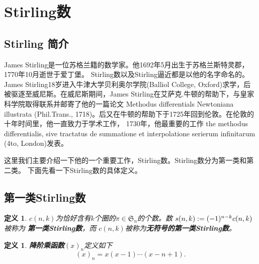 \documentclass[a4paper,11pt]{article}
\newtheorem{defi}[thm]{定义}
\begin{document}
%





\section{Stirling数}

\subsection{Stirling 简介} James
Stirling是一位苏格兰籍的数学家。他1692年5月出生于苏格兰斯特灵郡，1770年10月逝世于爱丁堡。
Stirling数以及Stirling逼近都是以他的名字命名的。James
Stirling18岁进入牛津大学贝利奥尔学院(Balliol College,
Oxford)求学，后被驱逐至威尼斯。在威尼斯期间，James
Stirling在艾萨克.牛顿的帮助下，与皇家科学院取得联系并邮寄了他的一篇论文
Methodus differentials Newtoniana illustrata (Phil.Trans.,
1718)。后又在牛顿的帮助下于1725年回到伦敦。在伦敦的十年时间里，他一直致力于学术工作，
1730年，他最重要的工作 the methodus differentialis, sive tractatus
de summatione et interpolatione serierum infinitarum (4to,
London)发表。

这里我们主要介绍一下他的一个重要工作，Stirling数。Stirling数分为第一类和第二类。
下面先看一下Stirling数的具体定义。

\subsection{第一类Stirling数}

\begin{defi}
$c(n,k)$为恰好含有$k$个圈的$\pi\in\mathfrak{S}_n$的个数。数
$s(n,k):=(-1)^{n-k}\\c(n,k)$被称为{\bf
第一类Stirling数}，而 $c(n,k)$被称为{\bf 无符号的第一类Stirling数}。
\end{defi}

\begin{defi}
{\bf 降阶乘函数}$(x)_n$定义如下
$$(x)_n=x(x-1)\cdots(x-n+1).$$
\end{defi}
\end{document}
